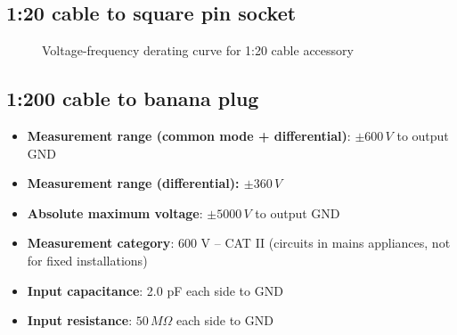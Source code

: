 \documentclass[10pt]{manual}
\begin{document}
\subsection{1:20 cable to square pin socket}

\begin{figure}[h]
    \sffamily
    \caption{Voltage-frequency derating curve for 1:20 cable accessory}
\end{figure}

\subsection{1:200 cable to banana plug}

\begin{itemize}
    \item \textbf{Measurement range (common mode + differential)}: $\pm600\,V$ to output GND
    \item \textbf{Measurement range (differential): $\pm360\,V$}
    \item \textbf{Absolute maximum voltage}: $\pm5000\,V$ to output GND
    \item \textbf{Measurement category}: 600 V -- CAT II (circuits in mains appliances, not for fixed installations)
    \item \textbf{Input capacitance}: 2.0 pF each side to GND
    \item \textbf{Input resistance}: $50\,M\Omega$ each side to GND
\end{itemize}
\end{document}
